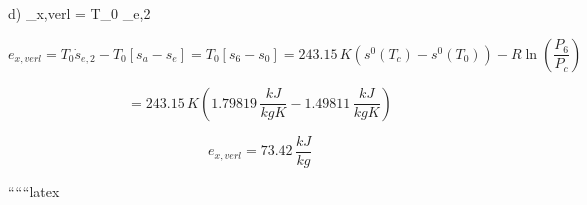d) \quad {}_{x,verl} = T_0 _{e,2}

\[
e_{x,verl} = T_0 \dot{s}_{e,2} - T_0 [s_a - s_e] = T_0 [s_6 - s_0] = 243.15 \, K \left( s^0 (T_c) - s^0 (T_0) \right) - R \ln \left( \frac{P_6}{P_c} \right)
\]

\[
= 243.15 \, K \left( 1.79819 \, \frac{kJ}{kgK} - 1.49811 \, \frac{kJ}{kgK} \right)
\]

\[
e_{x,verl} = 73.42 \, \frac{kJ}{kg}
\]

``````latex